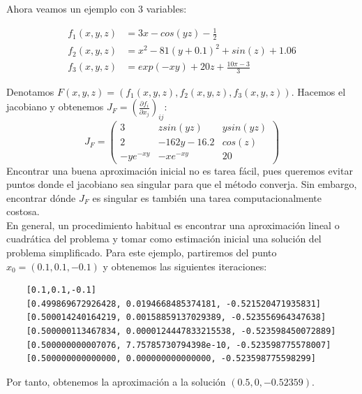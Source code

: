 \begin{example}

Ahora veamos un ejemplo con 3 variables:

\begin{align*}
	f_1(x,y,z) &= 3x - cos(yz) - \frac{1}{2} \\
	f_2(x,y,z) &= x^2 - 81(y+0.1)^2 + sin(z) + 1.06\\
	f_3(x,y,z) &= exp(-xy) + 20z + \frac{10\pi-3}{3}
\end{align*}

Denotamos $F(x,y,z) = (f_1(x,y,z),f_2(x,y,z),f_3(x,y,z))$.
Hacemos el jacobiano y obtenemos $J_F =(\frac{\partial f_i}{\partial x_j})_{ij}$:
$$
	J_F = 
	\begin{pmatrix}
	3 & z sin(yz) & y sin(yz) \\
	2 & -162y-16.2 & cos(z) \\
	-ye^{-xy} & -xe^{-xy} & 20
	\end{pmatrix}
$$
Encontrar una buena aproximación inicial no es tarea fácil, pues queremos evitar puntos donde el jacobiano sea singular para que el método converja.
Sin embargo, encontrar dónde $J_F$ es singular es también una tarea computacionalmente costosa.\\
En general, un procedimiento habitual es encontrar una aproximación lineal o cuadrática del problema y tomar como estimación inicial una solución del problema simplificado.
Para este ejemplo, partiremos del punto $x_0 = (0.1,0.1,-0.1)$ y obtenemos las siguientes iteraciones:
\begin{verbatim}
	[0.1,0.1,-0.1]
	[0.499869672926428, 0.0194668485374181, -0.521520471935831]
	[0.500014240164219, 0.00158859137029389, -0.523556964347638]
	[0.500000113467834, 0.0000124447833215538, -0.523598450072889]
	[0.500000000007076, 7.75785730794398e-10, -0.523598775578007]
	[0.500000000000000, 0.000000000000000, -0.523598775598299]
\end{verbatim}

Por tanto, obtenemos la aproximación a la solución $(0.5, 0, -0.52359)$.


\end{example}

